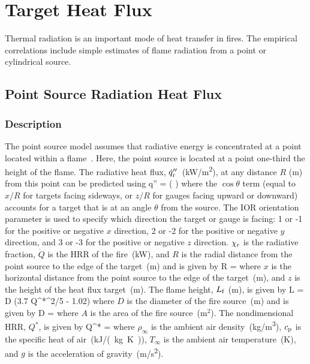 
\chapter{Target Heat Flux}
\label{Target_Heat_Flux_Chapter}

Thermal radiation is an important mode of heat transfer in fires. The empirical correlations include simple estimates of flame radiation from a point or cylindrical source.

\section{Point Source Radiation Heat Flux}
\label{sec:Point_Source_Radiation}

\subsection*{Description}

The point source model assumes that radiative energy is concentrated at a point located within a flame~\cite{Beyler2:SFPE}.
Here, the point source is located at a point one-third the height of the flame.
The radiative heat flux, $\dot q''\sb{r}$~(\si{kW/m^2}), at any distance $R$ (\si{m}) from this point can be predicted using
\be
\dot q'' = \cos\theta \left(  \right)
\label{eq:point_source}
\ee
where the $\cos\theta$ term (equal to $x/R$ for targets facing sideways, or $z/R$ for gauges facing upward or downward) accounts for a target that is at an angle $\theta$ from the source. The IOR orientation parameter is used to specify which direction the target or gauge is facing: 1 or -1 for the positive or negative $x$ direction, 2 or -2 for the positive or negative $y$ direction, and 3 or -3 for the positive or negative $z$ direction. $\chi\sb{r}$ is the radiative fraction, $\dot Q$ is the HRR of the fire~(\si{kW}), and $R$ is the radial distance from the point source to the edge of the target~(\si{m}) and is given by
\be
R = 
\label{eq:point_source_R}
\ee
where $x$ is the horizontal distance from the point source to the edge of the target~(\si{m}), and $z$ is the height of the heat flux target~(\si{m}). The flame height, $L\sb{f}$ (\si{m}), is given by
\be
L = D (3.7 Q^{*^{2/5}} - 1.02)
\label{eq:point_source_Lf}
\ee
where $D$ is the diameter of the fire source~(\si{m}) and is given by
\be
D = 
\label{eq:point_source_D}
\ee
where $A$ is the area of the fire source~(m$^2$). The nondimensional HRR, $Q^*$, is given by
\be
Q^* = 
\label{eq:point_source_Qstar}
\ee
where $\rho_\infty$ is the ambient air density~(\si{kg/m^3}), $c\sb{p}$ is the specific heat of air~(\si{kJ/(kg.K)}), $T_\infty$ is the ambient air temperature~(\si{K}), and $g$ is the acceleration of gravity~(\si{m/s^2}).

